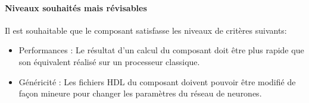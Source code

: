 \paragraph{Niveaux souhaités mais révisables\\}

Il est souhaitable que le composant satisfasse les niveaux de critères suivants:
\begin{itemize}
	\item Performances : Le résultat d'un calcul du composant doit être plus
		rapide que son équivalent réalisé sur un processeur classique.
	\item Généricité : Les fichiers HDL du composant doivent pouvoir être
		modifié de façon mineure pour changer les paramètres du réseau
		de neurones.
\end{itemize}


